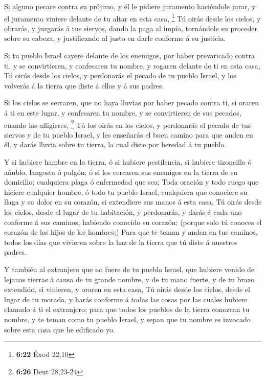  Si alguno pecare contra su prójimo, y él le pidiere
juramento haciéndole jurar, y el juramento viniere delante de tu altar
en esta casa, \footnote{\textbf{6:22} Éxod 22,10}  Tú
oirás desde los cielos, y obrarás, y juzgarás á tus siervos, dando la
paga al impío, tornándole su proceder sobre su cabeza, y justificando al
justo en darle conforme á su justicia.

 Si tu pueblo Israel cayere delante de los enemigos, por
haber prevaricado contra ti, y se convirtieren, y confesaren tu nombre,
y rogaren delante de ti en esta casa,  Tú oirás desde los
cielos, y perdonarás el pecado de tu pueblo Israel, y los volverás á la
tierra que diste á ellos y á sus padres.

 Si los cielos se cerraren, que no haya lluvias por haber
pecado contra ti, si oraren á ti en este lugar, y confesaren tu nombre,
y se convirtieren de sus pecados, cuando los afligieres, \footnote{\textbf{6:26}
  Deut 28,23-24}  Tú los oirás en los cielos, y
perdonarás el pecado de tus siervos y de tu pueblo Israel, y les
enseñarás el buen camino para que anden en él, y darás lluvia sobre tu
tierra, la cual diste por heredad á tu pueblo.

 Y si hubiere hambre en la tierra, ó si hubiere
pestilencia, si hubiere tizoncillo ó añublo, langosta ó pulgón; ó si los
cercaren sus enemigos en la tierra de su domicilio; cualquiera plaga ó
enfermedad que sea;  Toda oración y todo ruego que
hiciere cualquier hombre, ó todo tu pueblo Israel, cualquiera que
conociere su llaga y su dolor en su corazón, si extendiere sus manos á
esta casa,  Tú oirás desde los cielos, desde el lugar de
tu habitación, y perdonarás, y darás á cada uno conforme á sus caminos,
habiendo conocido su corazón; (porque solo tú conoces el corazón de los
hijos de los hombres;)  Para que te teman y anden en tus
caminos, todos los días que vivieren sobre la haz de la tierra que tú
diste á nuestros padres.

 Y también al extranjero que no fuere de tu pueblo
Israel, que hubiere venido de lejanas tierras á causa de tu grande
nombre, y de tu mano fuerte, y de tu brazo extendido, si vinieren, y
oraren en esta casa,  Tú oirás desde los cielos, desde el
lugar de tu morada, y harás conforme á todas las cosas por las cuales
hubiere clamado á ti el extranjero; para que todos los pueblos de la
tierra conozcan tu nombre, y te teman como tu pueblo Israel, y sepan que
tu nombre es invocado sobre esta casa que he edificado yo.

